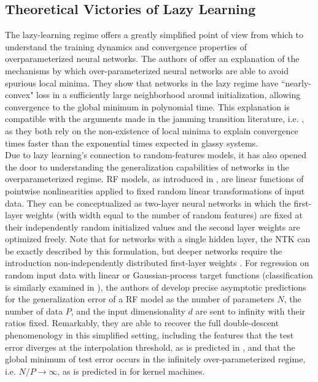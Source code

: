 \documentclass[a4paper, 11pt]{article}
\begin{document}
\subsection{Theoretical Victories of Lazy Learning}

The lazy-learning regime offers a greatly simplified point of view from which to understand the training dynamics and convergence properties of overparameterized neural networks. The authors of \cite{allen-zhuConvergenceTheoryDeep2019} offer an explanation of the mechanisms by which over-parameterized neural networks are able to avoid spurious local minima. They show that networks in the lazy regime have ``nearly-convex" loss in a sufficiently large neighborhood around initialization, allowing convergence to the global minimum in polynomial time. This explanation is compatible with the arguments made in the jamming transition literature, i.e. \cite{geigerJammingTransitionParadigm2019,spiglerJammingTransitionOverparametrization2019}, as they both rely on the non-existence of local minima to explain convergence times faster than the exponential times expected in glassy systems.\\

Due to lazy learning's connection to random-features models, it has also opened the door to understanding the generalization capabilities of networks in the overparameterized regime. RF models, as introduced in \cite{rahimiRandomFeaturesLargeScale2008}, are linear functions of pointwise nonlinearities applied to fixed random linear transformations of input data. They can be conceptualized as two-layer neural networks in which the first-layer weights (with width equal to the number of random features) are fixed at their independently random initialized values and the second layer weights are optimized freely. Note that for networks with a single hidden layer, the NTK can be exactly described by this formulation, but deeper networks require the introduction non-independently distributed first-layer weights \cite{chizatLazyTrainingDifferentiable2020}. For regression on random input data with linear or Gaussian-process target functions (classification is similarly examined in \cite{dengModelDoubleDescent2020}), the authors of \cite{meiGeneralizationErrorRandom2019} develop precise asymptotic predictions for the generalization error of a RF model as the number of parameters $N$, the number of data $P$, and the input dimensionality $d$ are sent to infinity with their ratios fixed. Remarkably, they are able to recover the full double-descent phenomenology in this simplified setting, including the features that the test error diverges at the interpolation threshold, as is predicted in \cite{geigerScalingDescriptionGeneralization2019}, and that the global minimum of test error occurs in the infinitely over-parameterized regime, i.e. $N/P\rightarrow\infty$, as is predicted in \cite{belkinReconcilingModernMachine2019,belkinUnderstandDeepLearning2018} for kernel machines.\\
\end{document}
